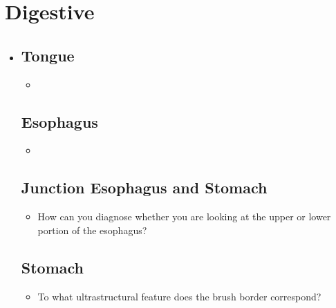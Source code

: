 \section{Digestive}\label{Digestive}
\begin{itemize}
  \item[]

  \subsection{Tongue}\label{Tongue}
  \begin{multicols}{2}
  \begin{itemize}
    \item 
  \end{itemize}
  \end{multicols}

  \subsection{Esophagus}\label{Esophagus}
  \begin{multicols}{2}
  \begin{itemize}
    \item 
  \end{itemize}
  \end{multicols}
  
  \subsection{Junction Esophagus and Stomach}\label{Junction Esophagus and Stomach}
  \begin{multicols}{2}
  \begin{itemize}
    \item How can you diagnose whether you are  
    looking at the upper or lower portion of the esophagus?
  \end{itemize}
  \end{multicols}

  \subsection{Stomach}\label{Stomach}
  \begin{multicols}{2}
  \begin{itemize}
    \item To what ultrastructural feature does the brush border correspond?
  \end{itemize}
  \end{multicols}


\end{itemize}
